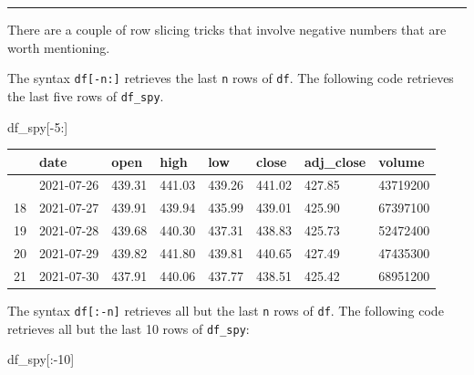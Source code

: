 \documentclass[
  letterpaper,
  DIV=11,
  numbers=noendperiod]{scrreprt}
\newenvironment{Shaded}{\begin{snugshade}}{\end{snugshade}}
\newcommand{\DecValTok}[1]{\textcolor[rgb]{0.68,0.00,0.00}{#1}}
\newcommand{\NormalTok}[1]{\textcolor[rgb]{0.00,0.23,0.31}{#1}}
\newcommand{\OperatorTok}[1]{\textcolor[rgb]{0.37,0.37,0.37}{#1}}
\begin{document}
\begin{center}\rule{0.5\linewidth}{0.5pt}\end{center}

There are a couple of row slicing tricks that involve negative numbers
that are worth mentioning.

The syntax \texttt{df{[}-n:{]}} retrieves the last \texttt{n} rows of
\texttt{df}. The following code retrieves the last five rows of
\texttt{df\_spy}.

\begin{Shaded}
\begin{Highlighting}[]
\NormalTok{df\_spy[}\OperatorTok{{-}}\DecValTok{5}\NormalTok{:]}
\end{Highlighting}
\end{Shaded}

\begin{longtable}[]{@{}llllllll@{}}
\toprule\noalign{}
& date & open & high & low & close & adj\_close & volume \\
\midrule\noalign{}
\endhead
\bottomrule\noalign{}
\endlastfoot
17 & 2021-07-26 & 439.31 & 441.03 & 439.26 & 441.02 & 427.85 &
43719200 \\
18 & 2021-07-27 & 439.91 & 439.94 & 435.99 & 439.01 & 425.90 &
67397100 \\
19 & 2021-07-28 & 439.68 & 440.30 & 437.31 & 438.83 & 425.73 &
52472400 \\
20 & 2021-07-29 & 439.82 & 441.80 & 439.81 & 440.65 & 427.49 &
47435300 \\
21 & 2021-07-30 & 437.91 & 440.06 & 437.77 & 438.51 & 425.42 &
68951200 \\
\end{longtable}

The syntax \texttt{df{[}:-n{]}} retrieves all but the last \texttt{n}
rows of \texttt{df}. The following code retrieves all but the last 10
rows of \texttt{df\_spy}:

\begin{Shaded}
\begin{Highlighting}[]
\NormalTok{df\_spy[:}\OperatorTok{{-}}\DecValTok{10}\NormalTok{]}
\end{Highlighting}
\end{Shaded}
\end{document}
